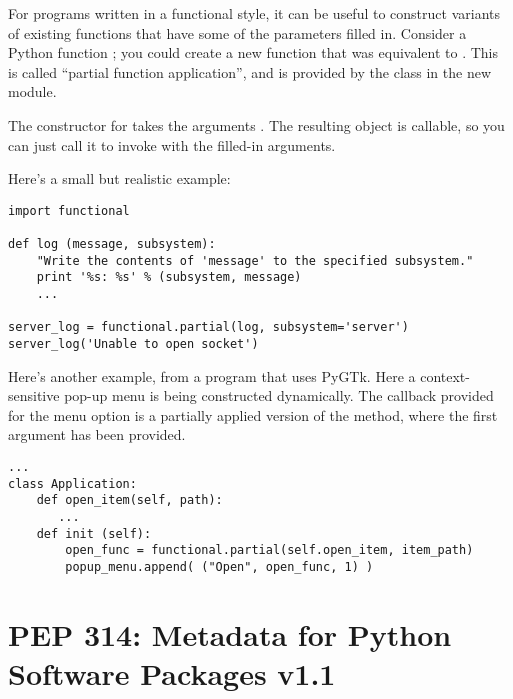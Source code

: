 \documentclass{howto}
\begin{document}
For programs written in a functional style, it can be useful to
construct variants of existing functions that have some of the
parameters filled in.  Consider a Python function ;
you could create a new function  that was equivalent to
.  This is called ``partial function application'',
and is provided by the  class in the new
 module.

The constructor for  takes the arguments
.  The resulting
object is callable, so you can just call it to invoke 
with the filled-in arguments.

Here's a small but realistic example:

\begin{verbatim}
import functional

def log (message, subsystem):
    "Write the contents of 'message' to the specified subsystem."
    print '%s: %s' % (subsystem, message)
    ...

server_log = functional.partial(log, subsystem='server')
server_log('Unable to open socket')
\end{verbatim}

Here's another example, from a program that uses PyGTk.  Here a
context-sensitive pop-up menu is being constructed dynamically.  The
callback provided for the menu option is a partially applied version
of the  method, where the first argument has been
provided.

\begin{verbatim}
...
class Application:
    def open_item(self, path):
       ...
    def init (self):
        open_func = functional.partial(self.open_item, item_path)
        popup_menu.append( ("Open", open_func, 1) )
\end{verbatim}


\begin{seealso}


\end{seealso}


\section{PEP 314: Metadata for Python Software Packages v1.1\label{pep-314}}
\end{document}
